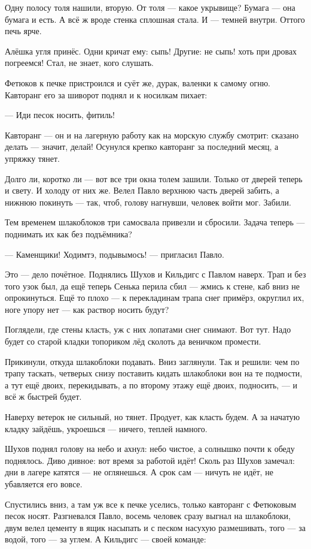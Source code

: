 Одну полосу толя нашили, вторую. От толя --- какое укрывище? Бумага --- она бумага и есть. А всё ж
вроде стенка сплошная стала. И --- темней внутри. Оттого печь ярче.

Алёшка угля принёс. Одни кричат ему: сыпь! Другие: не сыпь! хоть при дровах погреемся! Стал, не
знает, кого слушать.

Фетюков к печке пристроился и суёт же, дурак, валенки к самому огню. Кавторанг его за шиворот
поднял и к носилкам пихает:

--- Иди песок носить, фитиль!

Кавторанг --- он и на лагерную работу как на морскую службу смотрит: сказано делать --- значит,
делай! Осунулся крепко кавторанг за последний месяц, а упряжку тянет.

Долго ли, коротко ли --- вот все три окна толем зашили. Только от дверей теперь и свету. И
холоду от них же. Велел Павло верхнюю часть дверей забить, а нижнюю покинуть --- так, чтоб,
голову нагнувши, человек войти мог. Забили.

Тем временем шлакоблоков три самосвала привезли и сбросили. Задача теперь --- поднимать их
как без подъёмника?

--- Каменщики! Ходимтэ, подывымось! --- пригласил Павло.

Это --- дело почётное. Поднялись Шухов и Кильдигс с Павлом наверх. Трап и без того узок был, да
ещё теперь Сенька перила сбил --- жмись к стене, каб вниз не опрокинуться. Ещё то плохо --- к
перекладинам трапа снег примёрз, округлил их, ноге упору нет --- как раствор носить будут?

Поглядели, где стены класть, уж с них лопатами снег снимают. Вот тут. Надо будет со старой
кладки топориком лёд сколоть да веничком промести.

Прикинули, откуда шлакоблоки подавать. Вниз заглянули. Так и решили: чем по трапу таскать,
четверых снизу поставить кидать шлакоблоки вон на те подмости, а тут ещё двоих,
перекидывать, а по второму этажу ещё двоих, подносить, --- и всё ж быстрей будет.

Наверху ветерок не сильный, но тянет. Продует, как класть будем. А за начатую кладку зайдёшь,
укроешься --- ничего, теплей намного.

Шухов поднял голову на небо и ахнул: небо чистое, а солнышко почти к обеду поднялось. Диво
дивное: вот время за работой идёт! Сколь раз Шухов замечал: дни в лагере катятся --- не
оглянешься. А срок сам --- ничуть не идёт, не убавляется его вовсе.

Спустились вниз, а там уж все к печке уселись, только кавторанг с Фетюковым песок носят.
Разгневался Павло, восемь человек сразу выгнал на шлакоблоки, двум велел цементу в ящик
насыпать и с песком насухую размешивать, того --- за водой, того --- за углем. А Кильдигс --- своей
команде:

